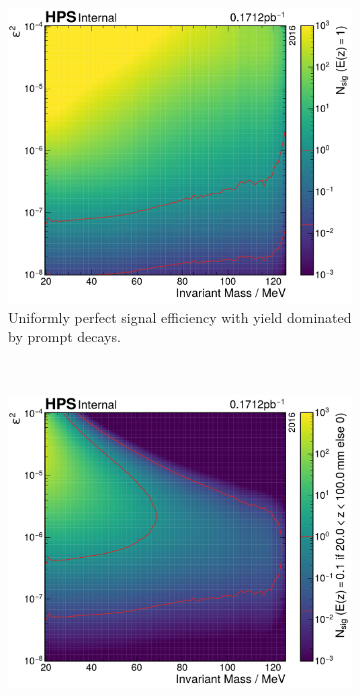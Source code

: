 \begin{figure}
  \centering
  \begin{subfigure}{0.48\textwidth}
    \includegraphics[width=\textwidth]{figures/hps/analysis/signal-yield/n-sig-uniform-eff-1.0.pdf}
    \caption{Uniformly perfect signal efficiency with yield dominated by prompt decays.}
    \label{fig:n-sig-eg:uniform}
  \end{subfigure}
  ~
  \begin{subfigure}{0.48\textwidth}
    \includegraphics[width=\textwidth]{figures/hps/analysis/signal-yield/n-sig-step-eff-0.1-after-20.0.pdf}

\end{subfigure}
\end{figure}
